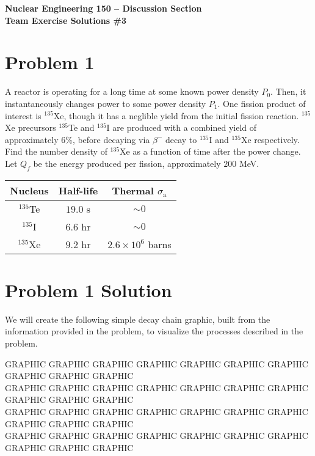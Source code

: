 \documentclass{report}
\begin{document}
\begin{center}
\textbf{\large Nuclear Engineering 150 -- Discussion Section}\\ 
\textbf{Team Exercise Solutions \#3}
\end{center}

\section*{Problem 1}

A reactor is operating for a long time at some known power density $P_0$. Then, it instantaneously changes power to some power density $P_1$. One fission product of interest is $^{135}$Xe, though it has a neglible yield from the initial fission reaction. $^{135}$Xe precursors $^{135}$Te and $^{135}$I are produced with a combined yield of approximately 6\%, before decaying via $\beta^{-}$ decay to $^{135}$I and $^{135}$Xe respectively. Find the number density of $^{135}$Xe as a function of time after the power change. Let $Q_f$ be the energy produced per fission, approximately $200$ MeV.

\begin{table}[htbp]
	\centering
	\begin{tabular}{|c|c|c|}
			\hline
			Nucleus		&	Half-life 	& Thermal $\sigma_{\text{a}}$ \\
			\hline
			$^{135}$Te	&  $19.0$ s 	& $\sim 0$\\
			$^{135}$I	&  $6.6$ hr 	& $\sim 0$\\
			$^{135}$Xe	&  $9.2$ hr 	& $2.6 \times 10^6$ barns \\
			\hline
	\end{tabular}
	\label{tab:design-specs}
\end{table}



\section*{Problem 1 Solution}

We will create the following simple decay chain graphic, built from the information provided in the problem, to visualize the processes described in the problem.

GRAPHIC GRAPHIC GRAPHIC GRAPHIC GRAPHIC GRAPHIC GRAPHIC GRAPHIC GRAPHIC GRAPHIC \\
GRAPHIC GRAPHIC GRAPHIC GRAPHIC GRAPHIC GRAPHIC GRAPHIC GRAPHIC GRAPHIC GRAPHIC \\
GRAPHIC GRAPHIC GRAPHIC GRAPHIC GRAPHIC GRAPHIC GRAPHIC GRAPHIC GRAPHIC GRAPHIC \\
GRAPHIC GRAPHIC GRAPHIC GRAPHIC GRAPHIC GRAPHIC GRAPHIC GRAPHIC GRAPHIC GRAPHIC \\
\end{document}
